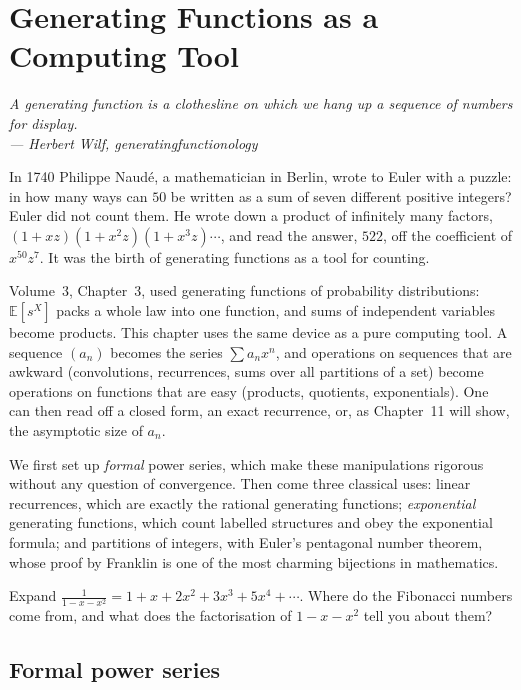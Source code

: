 \chapter{Generating Functions as a Computing Tool}

\begin{center}\itshape
A generating function is a clothesline on which we hang up a sequence of numbers for display.\\
\upshape --- Herbert Wilf, \emph{generatingfunctionology}
\end{center}

In 1740 Philippe Naud\'e, a mathematician in Berlin, wrote to Euler with a puzzle: in how many ways can $50$ be written as a sum of seven
different positive integers? Euler did not count them. He wrote down a product of infinitely many factors, $(1+xz)(1+x^2z)(1+x^3z)\cdots$, and
read the answer, $522$, off the coefficient of $x^{50}z^7$. It was the birth of generating functions as a tool for counting.

Volume~3, Chapter~3, used generating functions of probability distributions: $\mathbb E[s^X]$ packs a whole law
into one function, and sums of independent variables become products. This chapter uses the same device as a pure
computing tool. A sequence $(a_n)$ becomes the series $\sum a_nx^n$, and operations on sequences that are awkward
(convolutions, recurrences, sums over all partitions of a set) become operations on functions that are easy
(products, quotients, exponentials). One can then read off a closed form, an exact recurrence, or, as Chapter~11
will show, the asymptotic size of $a_n$.

We first set up \emph{formal} power series, which make these manipulations rigorous without any question of
convergence. Then come three classical uses: linear recurrences, which are exactly the rational generating
functions; \emph{exponential} generating functions, which count labelled structures and obey the exponential
formula; and partitions of integers, with Euler's pentagonal number theorem, whose proof by Franklin is one of
the most charming bijections in mathematics.

\begin{think}
Expand $\frac1{1-x-x^2}=1+x+2x^2+3x^3+5x^4+\cdots$. Where do the Fibonacci numbers come from, and what does the
factorisation of $1-x-x^2$ tell you about them?
\end{think}

\section{Formal power series}

